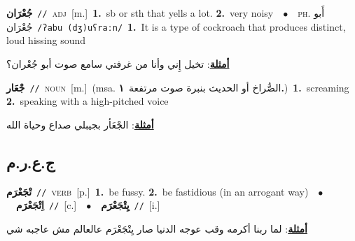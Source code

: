\documentclass[10pt,a4paper,twoside]{article} %
\begin{document}
\begin{multicols}{2}
{\setlength\topsep{0pt}\textbf{\foreignlanguage{arabic}{جُعْرَان}}\ {\color{gray}\texttt{//}\color{black}}\ \textsc{adj}\ [m.]\ \textbf{1.}~sb or sth that yells a lot.  \textbf{2.}~very noisy\ \ $\bullet$\ \ \textsc{ph.} \color{gray} \foreignlanguage{arabic}{أَبو جُعْرَان}\color{black}\ {\color{gray}\texttt{/{\sffamily ʔabu (dʒ)uʕraːn}/}\color{black}}\ \textbf{1.}~It is a type of cockroach that produces distinct, loud hissing sound\  \begin{flushright}\color{gray}\foreignlanguage{arabic}{\textbf{\underline{\foreignlanguage{arabic}{أمثلة}}}: تخيل إِني وأنا من غرفتي سامع صوت أبو جُعْران؟}\end{flushright}\color{black}} \vspace{2mm}

{\setlength\topsep{0pt}\textbf{\foreignlanguage{arabic}{جْعَار}}\ {\color{gray}\texttt{//}\color{black}}\ \textsc{noun}\ [m.]\ \color{gray}(msa. \foreignlanguage{arabic}{الصُّراخ أو الحديث بنبرة صوت مرتفعة}~\foreignlanguage{arabic}{\textbf{١.}})\color{black}\ \textbf{1.}~screaming  \textbf{2.}~speaking with a high-pitched voice\  \begin{flushright}\color{gray}\foreignlanguage{arabic}{\textbf{\underline{\foreignlanguage{arabic}{أمثلة}}}: الجْعَأر بجيبلي صداع وحياة الله}\end{flushright}\color{black}} \vspace{2mm}

\vspace{-3mm}
\subsection*{\color{blue}\foreignlanguage{arabic}{ج.ع.ر.م}\color{blue}{}} 

{\setlength\topsep{0pt}\textbf{\foreignlanguage{arabic}{تْجَعْرَم}}\ {\color{gray}\texttt{//}\color{black}}\ \textsc{verb}\ [p.]\ \textbf{1.}~be fussy.  \textbf{2.}~be fastidious (in an arrogant way)\ \ $\bullet$\ \ \setlength\topsep{0pt}\textbf{\foreignlanguage{arabic}{اِتْجَعْرَم}}\ {\color{gray}\texttt{//}\color{black}}\ [c.]\ \ $\bullet$\ \ \setlength\topsep{0pt}\textbf{\foreignlanguage{arabic}{يِتْجَعْرَم}}\ {\color{gray}\texttt{//}\color{black}}\ [i.]\  \begin{flushright}\color{gray}\foreignlanguage{arabic}{\textbf{\underline{\foreignlanguage{arabic}{أمثلة}}}: لما ربنا أكرمه وقب عوجه الدنيا صار يِتْجَعْرَم عالعالم مش عاجبه شي}\end{flushright}\color{black}} \vspace{2mm}


\end{multicols}
\end{document}
